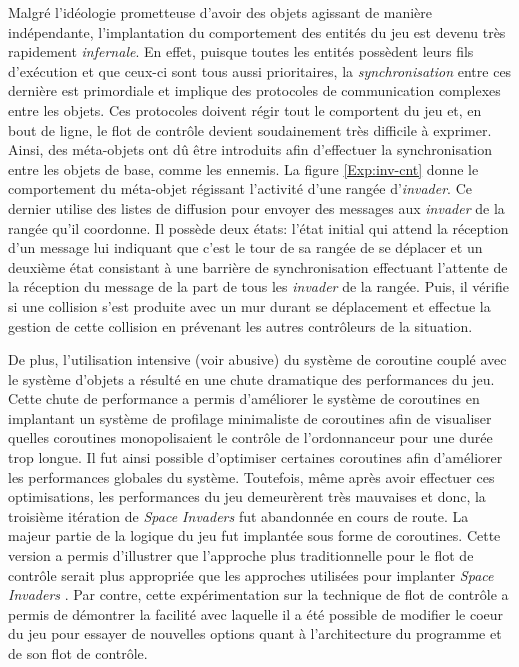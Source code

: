 \documentclass[12pt,twoside,letterpaper,francais]{book}
\newcommand{\si}{{\textit{Space Invaders }}}
\newcommand{\scheme}[1]{\selectlanguage{english}{\tt #1}\selectlanguage{french}}
\begin{document}
Malgré l'idéologie prometteuse d'avoir des objets agissant de manière
indépendante, l'implantation du comportement des entités du jeu est
devenu très rapidement \emph{infernale}. En effet, puisque toutes les
entités possèdent leurs fils d'exécution et que ceux-ci sont tous
aussi prioritaires, la \emph{synchronisation} entre ces dernière est
primordiale et implique des protocoles de communication complexes
entre les objets. Ces protocoles doivent régir tout le comportent du
jeu et, en bout de ligne, le flot de contrôle devient soudainement
très difficile à exprimer. Ainsi, des méta-objets ont dû être
introduits afin d'effectuer la synchronisation entre les objets de
base, comme les ennemis. La figure \ref{Exp:inv-cnt} donne le
comportement du méta-objet régissant l'activité d'une rangée
d'\textit{invader}. Ce dernier utilise des listes de diffusion pour
envoyer des messages aux \textit{invader} de la rangée qu'il
coordonne. Il possède deux états: l'état initial qui attend la
réception d'un message lui indiquant que c'est le tour de sa rangée de
se déplacer et un deuxième état consistant à une barrière de
synchronisation effectuant l'attente de la réception du message
\scheme{moved} de la part de tous les \textit{invader} de la
rangée. Puis, il vérifie si une collision s'est produite avec un mur
durant se déplacement et effectue la gestion de cette collision en
prévenant les autres contrôleurs de la situation.

De plus, l'utilisation intensive (voir abusive) du système de
coroutine couplé avec le système d'objets a résulté en une chute
dramatique des performances du jeu. Cette chute de performance a
permis d'améliorer le système de coroutines en implantant un système
de profilage minimaliste de coroutines afin de visualiser quelles
coroutines monopolisaient le contrôle de l'ordonnanceur pour une durée
trop longue. Il fut ainsi possible d'optimiser certaines coroutines
afin d'améliorer les performances globales du système. Toutefois, même
après avoir effectuer ces optimisations, les performances du jeu
demeurèrent très mauvaises et donc, la troisième itération de \si fut
abandonnée en cours de route. La majeur partie de la logique du jeu
fut implantée sous forme de coroutines. Cette version a permis
d'illustrer que l'approche plus traditionnelle pour le flot de
contrôle serait plus appropriée que les approches utilisées pour
implanter \si. Par contre, cette expérimentation sur la technique de
flot de contrôle a permis de démontrer la facilité avec laquelle il a
été possible de modifier le coeur du jeu pour essayer de nouvelles
options quant à l'architecture du programme et de son flot de
contrôle.\\
\end{document}
